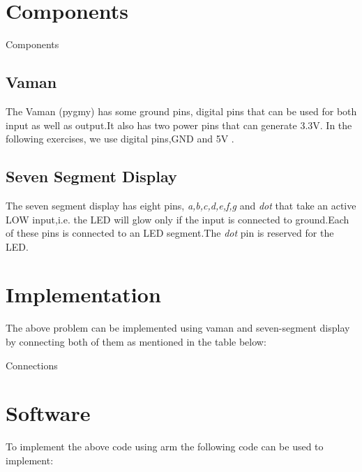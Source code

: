 \documentclass[10pt,a4paper]{article}
\begin{document}
\section{Components}
\begin{table}[h]
\centering

\caption{Components}
\label{table:components}
\end{table}
\subsection{Vaman} 
The Vaman (pygmy) has some ground pins, digital pins that can be used for both input as well as output.It also has two power pins that can generate 3.3V. In the following exercises, we use digital pins,GND and 5V .
\subsection{Seven Segment Display}
The seven segment display has eight pins, \emph{a,b,c,d,e,f,g} and \emph{dot} that take an active LOW input,i.e. the LED will glow only if the input is connected to ground.Each of these pins is connected to an LED segment.The \emph{dot} pin is reserved for the LED.
\section{Implementation}
The above problem can be implemented using vaman and seven-segment display by connecting both of them as mentioned in the table below:
\begin{table}[h]
	\centering
	
	\caption{Connections}
	\label{table:Connections}
\end{table}
\section{Software}
To implement the above code using arm the following code can be used to implement:

\end{document}
